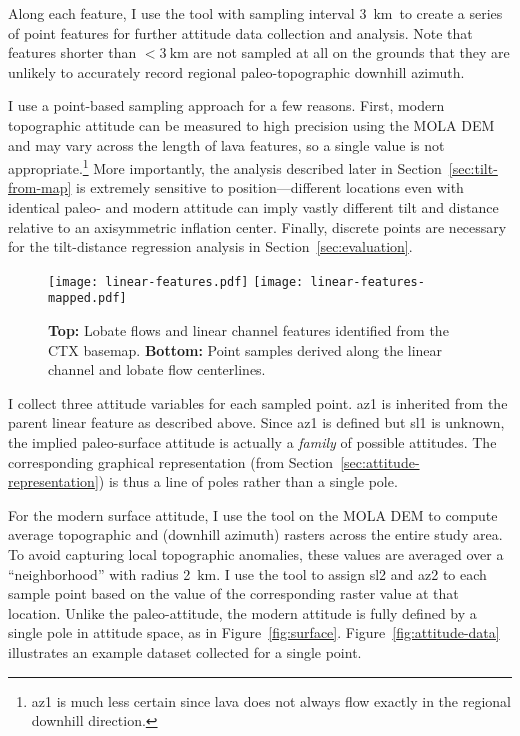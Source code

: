 \newcommand{\samplinginterval}{\qty{3}{\km}}

Along each feature, I use the  tool with sampling interval \samplinginterval\ to create a series of point features for further attitude data collection and analysis. Note that features shorter than $<\samplinginterval$ are not sampled at all on the grounds that they are unlikely to accurately record regional paleo-topographic downhill azimuth.

I use a point-based sampling approach for a few reasons. First, modern topographic attitude can be measured to high precision using the \ac{MOLA} \ac{DEM} and may vary across the length of lava features, so a single value is not appropriate.\footnote{\Acf{az1} is much less certain since lava does not always flow exactly in the regional downhill direction.} More importantly, the analysis described later in Section~\ref{sec:tilt-from-map} is extremely sensitive to position---different locations even with identical paleo- and modern attitude can imply vastly different tilt and distance relative to an axisymmetric inflation center. Finally, discrete points are necessary for the tilt-distance regression analysis in Section~\ref{sec:evaluation}.

\begin{figure}
    \texttt{[image: linear-features.pdf]}
    \texttt{[image: linear-features-mapped.pdf]}
    \caption[Mapping linear features]{\textbf{Top:} Lobate flows and linear channel features identified from the \acs{CTX} basemap. \textbf{Bottom:} Point samples derived along the linear channel and lobate flow centerlines.}%
    \label{fig:linear-features}
\end{figure}

\newcommand{\neighborhood}{\qty{2}{\km}}

I collect three attitude variables for each sampled point. \Acf{az1} is inherited from the parent linear feature as described above. Since \ac{az1} is defined but \acf{sl1} is unknown, the implied paleo-surface attitude is actually a \emph{family} of possible attitudes. The corresponding graphical representation (from Section~\ref{sec:attitude-representation}) is thus a line of poles rather than a single pole.

For the modern surface attitude, I use the  tool on the \ac{MOLA} \ac{DEM} to compute average topographic  and  (downhill azimuth) rasters across the entire study area. To avoid capturing local topographic anomalies, these values are averaged over a ``neighborhood'' with radius \neighborhood. I use the  tool to assign \ac{sl2} and \ac{az2} to each sample point based on the value of the corresponding raster value at that location. Unlike the paleo-attitude, the modern attitude is fully defined by a single pole in attitude space, as in Figure~\ref{fig:surface}. Figure~\ref{fig:attitude-data} illustrates an example dataset collected for a single point.

